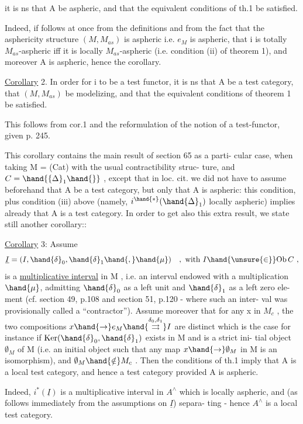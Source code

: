 
it is ns that A be aspheric,  and that the equivalent conditions of th.1
be satisfied.

Indeed,  if follows at once from the definitions  and from the
fact that the asphericity structure $(M,M_{as})$ is aspheric i.e.  $e_M$ is 
aspheric,  that  i is totally $M_{as}$-aspheric iff it is locally $M_{as}$-aspheric
(i.e. condition (ii) of theorem 1),  and  moreover A is aspheric,  hence
the corollary.

\uline{Corollary} 2.  In order for i to be a test functor,  it is ns that A be
a test category,  that $(M,M_{as})$  be modelizing,  and that the equivalent
conditions of theorem 1 be satisfied.

This follows from cor.1  and the reformulation of the notion of a
test-functor,  given  p. 245.

This corollary contains  the main result of section 65 as a parti-%
cular case,  when taking M = (Cat)  with the usual contractibility struc-%
ture,   and $C = \hand{\{\Delta}_1\hand{\}}$ ,  except that in loc. cit.  we did not
have to assume beforehand that A be a test category,  but only that A is
aspheric:  this condition,  plus condition (iii) above (namely,  $i^{\hand{*}}(\hand{\Delta}_1)$
locally aspheric)  implies already that A is a test category.  In order
to get also this extra result,  we state still another corollary:\hand{(*)}:

\uline{Corollary} 3:  Assume
\[ \underline{I} = (I, \hand{\delta}_0, \hand{\delta}_1\hand{,} \hand{\mu}) \quad , \text{ with } I \hand{\unsure{\in}} \mathrm{Ob}\, C \ , \]
is a \uline{multiplicative interval} in M ,  i.e. an interval endowed with a
multiplication $\hand{\mu}$, admitting $\hand{\delta}_0$ as a left unit and $\hand{\delta}_1$ as a left zero ele-%
ment (cf. section 49, p.108  and section 51, p.120  - where such an inter-%
val was provisionally called a ``contractor'').  Assume moreover that for
any x in $M_c$ ,  the two compositions  $x \hand{\to} e_M \hand{\overset{\delta_0,\delta_1}{\rightrightarrows}} I$  are distinct\hand{(}  which
is the case for instance if  $\mathrm{Ker}(\hand{\delta}_0,\hand{\delta}_1)$  exists in M and is a strict ini-%
tial object $\emptyset_M$  of M  (i.e. an initial object such that any map $x \hand{\to} \emptyset_M$ in
M is an isomorphism),  and  $\emptyset_M \hand{\notin} M_c$ \hand{)}. Then the conditions of th.1  imply
that A is a local test category,  and hence a test category provided A is
aspheric.

Indeed,  $i^*(\underline{I})$  is a multiplicative interval in $A^\wedge$ which is locally
aspheric,  and (as follows immediately from the assumptions on $\underline{I}$) separa-%
ting  -  hence $A^\wedge$ is a local test category.

